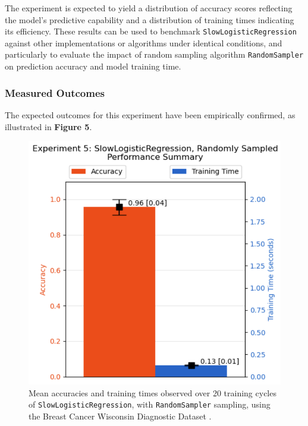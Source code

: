 \documentclass{article}
\theoremstyle{plain}
\theoremstyle{definition}
\theoremstyle{remark}
\begin{document}
The experiment is expected to yield a distribution of accuracy scores reflecting the model's predictive capability and a distribution of training times indicating its efficiency. These results can be used to benchmark \texttt{SlowLogisticRegression} against other implementations or algorithms under identical conditions, and particularly to evaluate the impact of random sampling algorithm \texttt{RandomSampler} on prediction accuracy and model training time.


\subsubsection{Measured Outcomes}

The expected outcomes for this experiment have been empirically confirmed, as illustrated in \textbf{Figure 5}.

\begin{figure}[ht]
	\vskip 0.2in
	\begin{center}
		\centerline{\includegraphics[width=\columnwidth]{experiment_05}}
		\caption{Mean accuracies and training times observed over 20 training cycles of \texttt{SlowLogisticRegression}, with \texttt{RandomSampler} sampling, using the Breast Cancer Wisconsin Diagnostic Dataset \cite{breastcancer}.}
		\label{experiment_05}
	\end{center}
	\vskip -0.2in
\end{figure}
\end{document}
